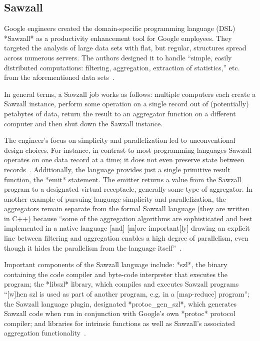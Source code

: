 \pv 

\subsection{Sawzall}

Google engineers created the domain-specific programming language
(DSL) *Sawzall* as a productivity enhancement tool for Google
employees.  They targeted the analysis of large data sets with flat,
but regular, structures spread across numerous servers.  The authors
designed it to handle ``simple, easily distributed computations:
filtering, aggregation, extraction of statistics,'' etc. from the
aforementioned data sets~\cite{pike05sawzall}.

     In general terms, a Sawzall job works as follows: multiple
     computers each create a Sawzall instance, perform some operation
     on a single record out of (potentially) petabytes of data, return
     the result to an aggregator function on a different computer and
     then shut down the Sawzall instance.

     The engineer's focus on simplicity and parallelization led to
     unconventional design choices.  For instance, in contrast to most
     programming languages Sawzall operates on one data record at a
     time; it does not even preserve state between
     records~\cite{www-bytemining-sawzall}. Additionally, the language
     provides just a single primitive result function, the *emit*
     statement.  The emitter returns a value from the Sawzall program
     to a designated virtual receptacle, generally some type of
     aggregator.  In another example of pursuing language simplicity
     and parallelization, the aggregators remain separate from the
     formal Sawzall language (they are written in C++) because ``some
     of the aggregation algorithms are sophisticated and best
     implemented in a native language [and] [m]ore important[ly]
     drawing an explicit line between filtering and aggregation
     enables a high degree of parallelism, even though it hides the
     parallelism from the language itself''~\cite{pike05sawzall}.

     Important components of the Sawzall language include: *szl*, the
     binary containing the code compiler and byte-code interpreter
     that executes the program; the *libszl* library, which compiles
     and executes Sawzall programs ``[w]hen szl is used as part of
     another program, e.g. in a [map-reduce] program''; the Sawzall
     language plugin, designated *protoc\_gen\_szl*, which generates
     Sawzall code when run in conjunction with Google's own *protoc*
     protocol compiler; and libraries for intrinsic functions as well
     as Sawzall's associated aggregation
     functionality~\cite{www-google-code-wiki-sawzall}.

